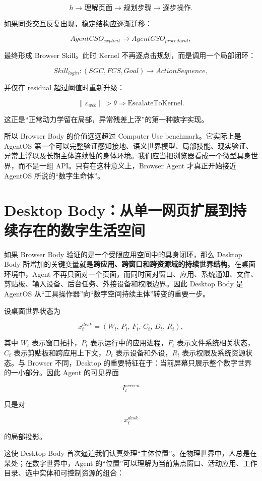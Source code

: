 $$
h\rightarrow
\text{理解页面}\rightarrow
\text{规划步骤}\rightarrow
\text{逐步操作}.
$$

如果同类交互反复出现，稳定结构应逐渐迁移：

$$
AgentCSO_{explicit}
\rightarrow
AgentCSO_{procedural},
$$

最终形成 Browser Skill。此时 Kernel 不再逐点击规划，而是调用一个局部闭环：

$$
Skill_{login}
:
(SGC,FCS,Goal)
\rightarrow
ActionSequence,
$$

并仅在 residual 超过阈值时重新升级：

$$
\|\varepsilon_{web}\|>\theta
\Rightarrow
\mathrm{EscalateToKernel}.
$$

这正是“正常动力学留在局部，异常残差上浮”的第一种数字实现。

所以 Browser Body 的价值远远超过 Computer Use benchmark。它实际上是 AgentOS 第一个可以完整验证感知接地、语义世界模型、局部技能、现实验证、异常上浮以及长期主体连续性的身体环境。我们应当把浏览器看成一个微型具身世界，而不是一组 API。只有在这种意义上，Browser Agent 才真正开始接近 AgentOS 所说的“数字生命体”。

\section{Desktop Body：从单一网页扩展到持续存在的数字生活空间}

如果 Browser Body 验证的是一个受限应用空间中的具身闭环，那么 Desktop Body 所增加的关键变量就是\textbf{跨应用、跨窗口和跨资源域的持续世界结构}。在桌面环境中，Agent 不再只面对一个页面，而同时面对窗口、应用、系统通知、文件、剪贴板、输入设备、后台任务、外接设备和权限边界。因此 Desktop Body 是 AgentOS 从“工具操作器”向“数字空间持续主体”转变的重要一步。

设桌面世界状态为

$$
x_t^{desk}
=
(
W_t,\,
P_t,\,
F_t,\,
C_t,\,
D_t,\,
R_t
),
$$

其中 $W_t$ 表示窗口拓扑，$P_t$ 表示运行中的应用进程，$F_t$ 表示文件系统相关状态，$C_t$ 表示剪贴板和跨应用上下文，$D_t$ 表示设备和外设，$R_t$ 表示权限及系统资源状态。与 Browser 不同，Desktop 的重要特征在于：当前屏幕只展示整个数字世界的一小部分。因此 Agent 的可见界面

$$
I_t^{screen}
$$

只是对

$$
x_t^{desk}
$$

的局部投影。

这使 Desktop Body 首次逼迫我们认真处理“主体位置”。在物理世界中，人总是在某处；在数字世界中，Agent 的“位置”可以理解为当前焦点窗口、活动应用、工作目录、选中实体和可控制资源的组合：

